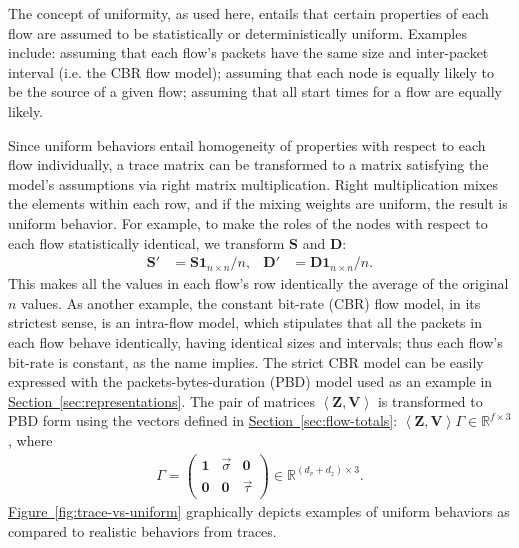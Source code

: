 \documentclass[twocolumn,final]{svjour3}
\newcommand{\caps}[1]{{\small{#1}}}
\newcommand{\Section}[1]{\hyperref[sec:#1]{Section~\ref*{sec:#1}}}
\newcommand{\Figure}[1]{\hyperref[fig:#1]{Figure~\ref*{fig:#1}}}
\newcommand{\R}{\mathbb{R}}
\newcommand{\ones}[1]{\mathbf{1}_{#1}}
\newcommand{\zeros}[1]{\mathbf{0}_{#1}}
\newcommand{\mat}[1]{\mathbf{#1}}
\newcommand{\seq}[1]{\left<#1\right>}
\begin{document}
The concept of uniformity, as used here, entails that certain properties of each flow are assumed to be statistically or deterministically uniform. Examples include: assuming that each flow's packets have the same size and inter-packet interval (i.e. the \caps{CBR} flow model); assuming that each node is equally likely to be the source of a given flow; assuming that all start times for a flow are equally likely.

Since uniform behaviors entail homogeneity of properties with respect to each flow individually, a trace matrix can be transformed to a matrix satisfying the model's assumptions via right matrix multiplication. Right multiplication mixes the elements within each row, and if the mixing weights are uniform, the result is uniform behavior. For example, to make the roles of the nodes with respect to each flow statistically identical, we transform $\mat{S}$ and $\mat{D}$:
\begin{align*}
\mat{S}' &= \mat{S}\ones{n \times n}/n, & \mat{D}' &= \mat{D}\ones{n \times n}/n.
\end{align*}
This makes all the values in each flow's row identically the average of the original $n$ values. As another example, the constant bit-rate (\caps{CBR}) flow model, in its strictest sense, is an intra-flow model, which stipulates that all the packets in each flow behave identically, having identical sizes and intervals; thus each flow's bit-rate is constant, as the name implies. The strict \caps{CBR} model can be easily expressed with the packets-bytes-duration (\caps{PBD}) model used as an example in \Section{representations}. The pair of matrices $\seq{\mat{Z},\mat{V}}$ is transformed to \caps{PBD} form using the vectors defined in \Section{flow-totals}: $\seq{\mat{Z},\mat{V}}\Gamma\in\R^{f \times 3}$, where
\begin{align}
\Gamma=\begin{pmatrix}
\ones{} & \vec{\sigma} & \zeros{} \\
\zeros{} & \zeros{} & \vec{\tau}
\end{pmatrix} \in \R^{(d_v+d_z)\times{3}}.
\end{align}
\Figure{trace-vs-uniform} graphically depicts examples of uniform behaviors as compared to realistic behaviors from traces.

\end{document}
